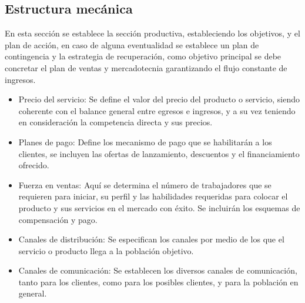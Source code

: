 \subsection{Estructura mecánica}

En esta sección se establece la sección productiva, estableciendo los objetivos, y el plan
de acción, en caso de alguna eventualidad se establece un plan de contingencia y la estrategia
de recuperación, como objetivo principal se debe concretar el plan de ventas y mercadotecnia
garantizando el flujo constante de ingresos.

\begin{itemize}
    \item Precio del servicio: Se define el valor del precio del producto o servicio, siendo coherente con el balance general entre egresos e ingresos, y a su vez teniendo en consideración la competencia directa y sus precios.
    
    \item Planes de pago: Define los mecanismo de pago que se habilitarán a los clientes, se incluyen las ofertas de lanzamiento, descuentos y el financiamiento ofrecido.

    \item Fuerza en ventas: Aquí se determina el número de trabajadores que se requieren para iniciar, su perfil y las habilidades requeridas para colocar el producto y sus servicios en el mercado con éxito. Se incluirán los esquemas de compensación y pago.

    \item Canales de distribución: Se especifican los canales por medio de los que el servicio o producto llega a la población objetivo.
    
    \item Canales de comunicación: Se establecen los diversos canales de comunicación, tanto para los clientes, como para los posibles clientes, y para la población en general.
\end{itemize}
